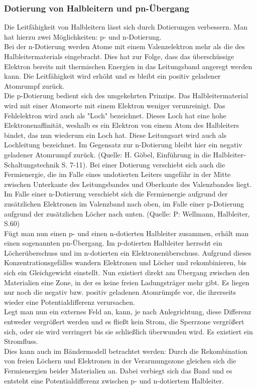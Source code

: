 \subsubsection{Dotierung von Halbleitern und pn-Übergang}
Die Leitfähigkeit von Halbleitern lässt sich durch Dotierungen verbessern. Man hat hierzu zwei Möglichkeiten: p- und n-Dotierung. \\
Bei der n-Dotierung werden Atome mit einem Valenzelektron mehr als die des Halbleitermaterials eingebracht. Dies hat zur Folge, dass das überschüssige Elektron bereits mit thermischen Energien in das Leitungsband angeregt werden kann. Die Leitfähigkeit wird erhöht und es bleibt ein positiv geladener Atomrumpf zurück.\\
Die p-Dotierung bedient sich des umgekehrten Prinzips. Das Halbleitermaterial wird mit einer Atomsorte mit einem Elektron weniger verunreinigt. Das Fehlelektron wird auch als "Loch" bezeichnet. Dieses Loch hat eine hohe Elektronenaffinität, weshalb es ein Elektron von einem Atom des Halbleiters bindet, das nun wiederum ein Loch hat. Diese Leitungsart wird auch als Lochleitung bezeichnet. Im Gegensatz zur n-Dotierung bleibt hier ein negativ geladener Atomrumpf zurück. (Quelle: H. Göbel, Einführung in die Halbleiter-Schaltungstechnik S. 7-11). Bei einer Dotierung verschiebt sich auch die Fermienergie, die im Falle eines undotierten Leiters ungefähr in der Mitte zwischen Unterkante des Leitungsbandes und Oberkante des Valenzbandes liegt. Im Falle einer n-Dotierung verschiebt sich die Fermienergie aufgrund der zusätzlichen Elektronen im Valenzband nach oben, im Falle einer p-Dotierung aufgrund der zusätzlichen Löcher nach unten. (Quelle: P: Wellmann, Halbleiter, S.60)\\
Fügt man nun einen p- und einen n-dotierten Halbleiter zusammen, erhält man einen sogenannten pn-Übergang. Im p-dotierten Halbleiter herrscht ein Löcherüberschuss und im n-dotierten ein Elektronenüberschuss. Aufgrund dieses Konzentrationsgefälles wandern Elektronen und Löcher und rekombinieren, bis sich ein Gleichgewicht einstellt. Nun existiert direkt am Übergang zwischen den Materialien eine Zone, in der es keine freien Ladungsträger mehr gibt. Es liegen nur noch die negativ bzw. positiv geladenen Atomrümpfe vor, die ihrerseits wieder eine Potentialdifferenz verursachen.\\
Legt man nun ein externes Feld an, kann, je nach Anlegrichtung, diese Differenz entweder vergrößert werden und es fließt kein Strom, die Sperrzone vergrößert sich, oder sie wird verringert bis sie schließlich überwunden wird. Es existiert ein Stromfluss. \\
Dies kann auch im Bändermodell betrachtet werden: Durch die Rekombination von freien Löchern und Elektronen in der Verarmungszone gleichen sich die Fermienergien beider Materialien an. Dabei verbiegt sich das Band und es entsteht eine Potentialdifferenz zwischen p- und n-dotiertem Halbleiter. \\

